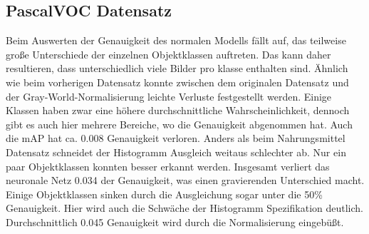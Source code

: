 \documentclass[a4paper,12pt,oneside]{article}
\begin{document}
\subsection{PascalVOC Datensatz}
Beim Auswerten der Genauigkeit des normalen Modells fällt auf, das teilweise große Unterschiede der einzelnen Objektklassen auftreten. Das kann daher resultieren, dass unterschiedlich viele Bilder pro klasse enthalten sind. Ähnlich wie beim vorherigen Datensatz konnte zwischen dem originalen Datensatz und der Gray-World-Normalisierung leichte Verluste festgestellt werden. Einige Klassen haben zwar eine höhere durchschnittliche Wahrscheinlichkeit, dennoch gibt es auch hier mehrere Bereiche, wo die Genauigkeit abgenommen hat. Auch die mAP hat ca. 0.008 Genauigkeit verloren. Anders als beim Nahrungsmittel Datensatz schneidet der Histogramm Ausgleich weitaus schlechter ab. Nur ein paar Objektklassen konnten besser erkannt werden. Insgesamt verliert das neuronale Netz 0.034 der Genauigkeit, was einen gravierenden Unterschied macht. Einige Objektklassen sinken durch die Ausgleichung sogar unter die 50\% Genauigkeit. Hier wird auch die Schwäche der Histogramm Spezifikation deutlich. Durchschnittlich 0.045 Genauigkeit wird durch die Normalisierung eingebüßt. 
\end{document}
